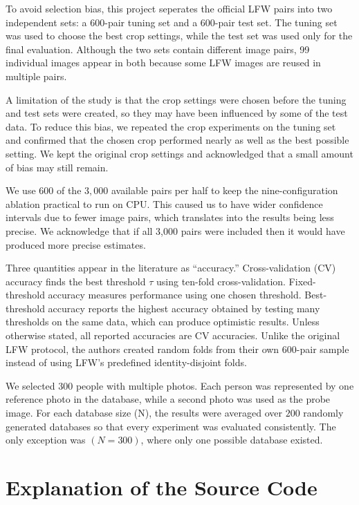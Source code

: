 \documentclass[conference]{IEEEtran}
\begin{document}
To avoid selection bias, this project seperates the official LFW pairs into two independent sets: a 600-pair tuning set and a 600-pair test set. The tuning set was used to choose the best crop settings, while the test set was used only for the final evaluation. Although the two sets contain different image pairs, 99 individual images appear in both because some LFW images are reused in multiple pairs.

A limitation of the study is that the crop settings were chosen before the tuning and test sets were created, so they may have been influenced by some of the test data. To reduce this bias, we repeated the crop experiments on the tuning set and confirmed that the chosen crop performed nearly as well as the best possible setting. We kept the original crop settings and acknowledged that a small amount of bias may still remain.


We use $600$ of the $3{,}000$ available pairs per half to keep the
nine-configuration ablation practical to run on CPU. This caused us to have wider confidence intervals due to fewer image pairs, which translates into the results being less precise. We acknowledge that if all 3,000 pairs were included then it would have produced more precise estimates.

Three quantities appear in the literature as ``accuracy.'' Cross-validation (CV) accuracy finds the best threshold $\tau$ using ten-fold cross-validation. Fixed-threshold accuracy measures performance using one chosen threshold. Best-threshold accuracy reports the highest accuracy obtained by testing many thresholds on the same data, which can produce optimistic results. Unless otherwise stated, all reported accuracies are CV accuracies. Unlike the original LFW protocol, the authors created random folds from their own 600-pair sample instead of using LFW's predefined identity-disjoint folds.

We selected $300$ people with multiple photos. Each person was represented by one reference photo in the database, while a second photo was used as the probe image. For each database size (N), the results were averaged over $200$ randomly generated databases so that every experiment was evaluated consistently. The only exception was $(N = 300)$, where only one possible database existed.

\section{Explanation of the Source Code}
\end{document}
